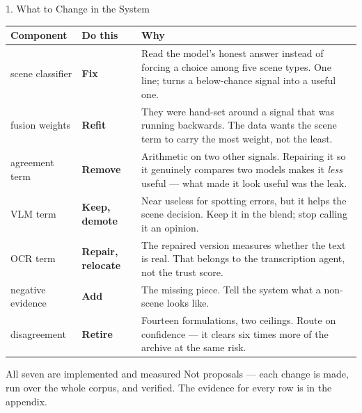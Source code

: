 \documentclass[aspectratio=169,11pt]{beamer}
\begin{document}
\begin{frame}{1. What to Change in the System}
\tiny
\begin{center}
\begin{tabular}{@{}l l p{7.0cm}@{}}
\toprule
\textbf{Component} & \textbf{Do this} & \textbf{Why} \\
\midrule
scene classifier & \textbf{Fix} & Read the model's honest answer instead of forcing a choice among five scene types. One line; turns a below-chance signal into a useful one. \\
\addlinespace
fusion weights & \textbf{Refit} & They were hand-set around a signal that was running backwards. The data wants the scene term to carry the most weight, not the least. \\
\addlinespace
agreement term & \textbf{Remove} & Arithmetic on two other signals. Repairing it so it genuinely compares two models makes it \emph{less} useful --- what made it look useful was the leak. \\
\addlinespace
VLM term & \textbf{Keep, demote} & Near useless for spotting errors, but it helps the scene decision. Keep it in the blend; stop calling it an opinion. \\
\addlinespace
OCR term & \textbf{Repair, relocate} & The repaired version measures whether the text is real. That belongs to the transcription agent, not the trust score. \\
\addlinespace
negative evidence & \textbf{Add} & The missing piece. Tell the system what a non-scene looks like. \\
\addlinespace
disagreement & \textbf{Retire} & Fourteen formulations, two ceilings. Route on confidence --- it clears six times more of the archive at the same risk. \\
\bottomrule
\end{tabular}
\end{center}
\vspace{1mm}
\begin{exampleblock}{\scriptsize All seven are implemented and measured}
\scriptsize Not proposals --- each change is made, run over the whole corpus, and verified. The evidence for every row is in the appendix.
\end{exampleblock}
\end{frame}
\end{document}
